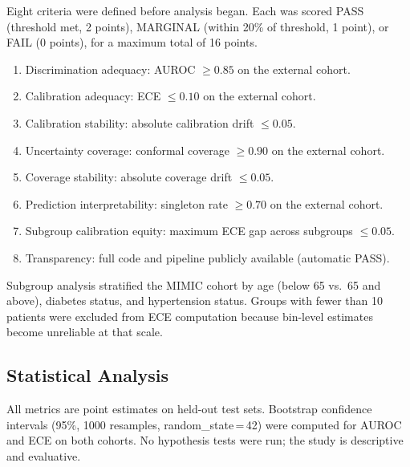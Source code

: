 Eight criteria were defined before analysis began. Each was scored PASS (threshold met, 2 points), MARGINAL (within 20\% of threshold, 1 point), or FAIL (0 points), for a maximum total of 16 points.

\begin{enumerate}
  \item Discrimination adequacy: AUROC $\geq 0.85$ on the external cohort.
  \item Calibration adequacy: ECE $\leq 0.10$ on the external cohort.
  \item Calibration stability: absolute calibration drift $\leq 0.05$.
  \item Uncertainty coverage: conformal coverage $\geq 0.90$ on the external cohort.
  \item Coverage stability: absolute coverage drift $\leq 0.05$.
  \item Prediction interpretability: singleton rate $\geq 0.70$ on the external cohort.
  \item Subgroup calibration equity: maximum ECE gap across subgroups $\leq 0.05$.
  \item Transparency: full code and pipeline publicly available (automatic PASS).
\end{enumerate}

Subgroup analysis stratified the MIMIC cohort by age (below 65 vs.\ 65 and above), diabetes status, and hypertension status. Groups with fewer than 10 patients were excluded from ECE computation because bin-level estimates become unreliable at that scale.

\subsection{Statistical Analysis}

All metrics are point estimates on held-out test sets. Bootstrap confidence intervals (95\%, 1000 resamples, random\_state\,=\,42) were computed for AUROC and ECE on both cohorts. No hypothesis tests were run; the study is descriptive and evaluative.

